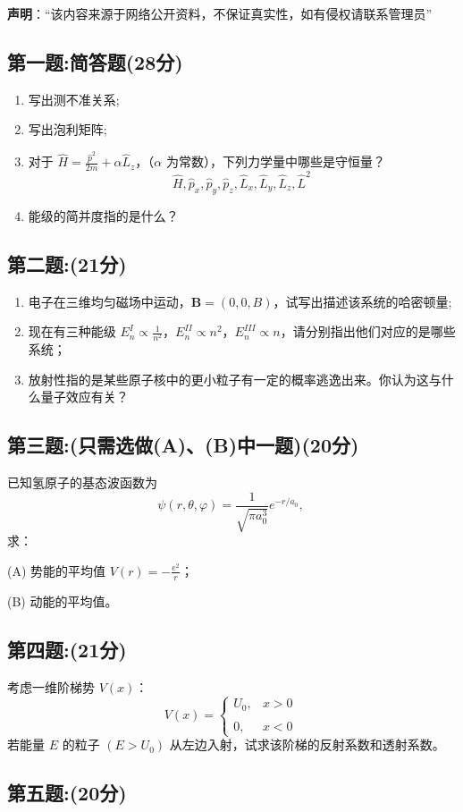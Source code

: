 
\textbf{声明}：“该内容来源于网络公开资料，不保证真实性，如有侵权请联系管理员”

\subsection{第一题:简答题(28分)}
\begin{enumerate}
    \item 写出测不准关系;
    \item 写出泡利矩阵;
    \item 对于 $\hat{H} = \frac{\hat{p}^2}{2m} + \alpha \hat{L}_z$，（$\alpha$ 为常数），下列力学量中哪些是守恒量？
    \[    \hat{H}, \hat{p}_x, \hat{p}_y, \hat{p}_z, \hat{L}_x, \hat{L}_y, \hat{L}_z, \hat{L}^2 ~\]
    \item 能级的简并度指的是什么？
\end{enumerate}
\subsection{第二题:(21分)}
\begin{enumerate}
    \item 电子在三维均匀磁场中运动，$\mathbf{B} = (0, 0, B)$，试写出描述该系统的哈密顿量;
    \item 现在有三种能级 $E_n^I \propto \frac{1}{n^2}$，$E_n^{II} \propto n^2$，$E_n^{III} \propto n$，请分别指出他们对应的是哪些系统；
    \item 放射性指的是某些原子核中的更小粒子有一定的概率逃逸出来。你认为这与什么量子效应有关？
\end{enumerate}
\subsection{第三题:(只需选做(A)、(B)中一题)(20分)}
已知氢原子的基态波函数为
\[\psi(r, \theta, \varphi) = \frac{1}{\sqrt{\pi a_0^3}} e^{-r/a_0},~\]
求：

(A) 势能的平均值 \(V(r) = -\frac{e^2}{r}\)；

(B) 动能的平均值。
\subsection{第四题:(21分)}
考虑一维阶梯势 \(V(x)\)：
\[V(x) = \begin{cases} U_0, & x > 0 \\\\0, & x < 0\end{cases}~\]
若能量 \(E\) 的粒子 \( (E > U_0) \) 从左边入射，试求该阶梯的反射系数和透射系数。
\subsection{第五题:(20分)}